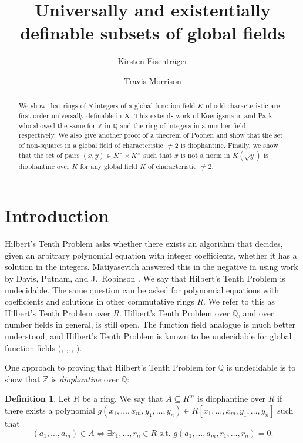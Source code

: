 \documentclass[12pt,reqno]{amsart}
\title{Universally and existentially definable subsets of global fields}
\author{Kirsten Eisentr\"{a}ger}
\author{Travis Morrison}
\newcommand{\QQ}{\mathbb{Q}}
\newcommand{\ZZ}{\mathbb{Z}}
\theoremstyle{definition}
\newtheorem{defn}[thm]{Definition}
\begin{document}
\begin{abstract}
  We show that rings of $S$-integers of a global function field $K$ of odd
  characteristic are first-order universally definable in $K$. This extends
  work of Koenigsmann and Park who showed the same for $\ZZ$ in $\QQ$ and the ring of integers in a
  number field, respectively.
  We also give another proof of a theorem of Poonen and show that the
  set of non-squares in
  a global field of characteristic $\not=2$ is diophantine. Finally, we show that the set of pairs
  $(x,y)\in K^{\times}\times K^{\times}$ such that $x$ is not a norm
  in $K(\sqrt{y})$ is diophantine over $K$ for any global field $K$ of characteristic $\not=2$.
\end{abstract}

\maketitle

\section{Introduction}

Hilbert's Tenth Problem asks whether there exists an algorithm that
decides, given an arbitrary polynomial equation with integer
coefficients, whether it has a solution in the integers. Matiyasevich
answered this in the negative in \cite{Mat70} using work by Davis,
Putnam, and J.\ Robinson \cite{DPR61}. We say that Hilbert's Tenth
Problem is undecidable. The same question can be asked for polynomial
equations with coefficients and solutions in other commutative rings
$R$. We refer to this as Hilbert's Tenth Problem over $R$. Hilbert's
Tenth Problem over $\QQ$, and over number fields in general, is still
open. The function field analogue is much better understood, and
Hilbert's Tenth Problem is known to be undecidable for global function
fields (\cite{Ph91}, \cite{Vi94}, \cite{Sh96}, \cite{Eis03}).


One approach to proving that Hilbert's Tenth Problem for $\QQ$ is
undecidable is to show that $\ZZ$ is \emph{diophantine} over $\QQ$:
\begin{defn}
  Let $R$ be a ring. We say that $A\subseteq R^m$ is diophantine over
  $R$ if there exists a polynomial
  $g(x_1,\ldots,x_m,y_1,\ldots,y_n)\in
  R[x_1,\ldots,x_m,y_1,\ldots,y_n]$ such that
\[
(a_1,\ldots,a_m)\in A \iff \exists r_1,\ldots,r_n \in R \text{ s.t. } g(a_1,\ldots,a_m,r_1,\ldots,r_n)=0.
\]
\end{defn}
\end{document}
